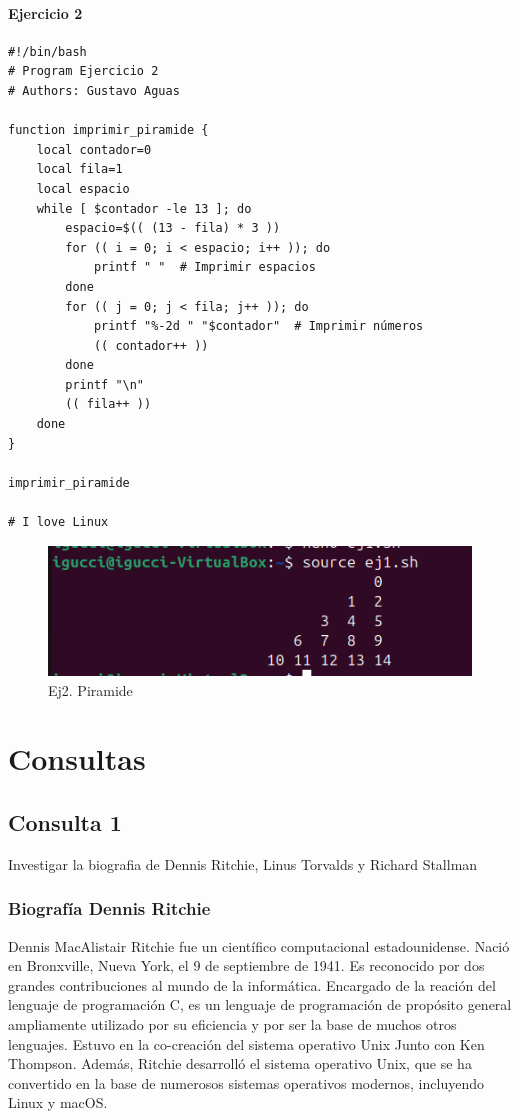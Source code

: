 \documentclass[11pt,twoside]{book}
\begin{document}
\subsubsection{Ejercicio 2}
\begin{lstlisting}
#!/bin/bash
# Program Ejercicio 2
# Authors: Gustavo Aguas

function imprimir_piramide {
    local contador=0
    local fila=1
    local espacio
    while [ $contador -le 13 ]; do
        espacio=$(( (13 - fila) * 3 ))
        for (( i = 0; i < espacio; i++ )); do
            printf " "  # Imprimir espacios
        done
        for (( j = 0; j < fila; j++ )); do
            printf "%-2d " "$contador"  # Imprimir números
            (( contador++ ))
        done
        printf "\n"
        (( fila++ ))
    done
}

imprimir_piramide

# I love Linux
\end{lstlisting}
\begin{figure}
    \centering
    \includegraphics[width=0.5\linewidth]{Ej2piram.png}
    \caption{Ej2. Piramide}
\end{figure}
\newpage

\chapter{Consultas}
\section{Consulta 1}
Investigar la biografia de Dennis Ritchie, Linus Torvalds y Richard Stallman
\\
\vspace{5pt}
\subsection{{\bfseries Biografía Dennis Ritchie}} 

\vspace{5pt}
Dennis MacAlistair Ritchie fue un científico computacional estadounidense. Nació en Bronxville, Nueva York, el 9 de septiembre de 1941. Es reconocido por dos grandes contribuciones al mundo de la informática. Encargado de la reación del lenguaje de programación C,  es un lenguaje de programación de propósito general ampliamente utilizado por su eficiencia y por ser la base de muchos otros lenguajes. Estuvo en la co-creación del sistema operativo Unix Junto con Ken Thompson. Además, Ritchie desarrolló el sistema operativo Unix, que se ha convertido en la base de numerosos sistemas operativos modernos, incluyendo Linux y macOS.
\end{document}
